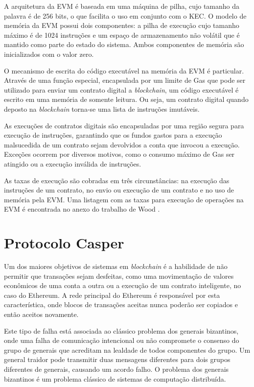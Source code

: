 \documentclass[tcc,capa]{texufpel}
\begin{document}
	A arquitetura da EVM é baseada em uma máquina de pilha, cujo tamanho da palavra é de 256 bits, o que facilita o uso em conjunto com o KEC. O modelo de memória da EVM possui dois componentes: a pilha de execução cujo tamanho máximo é de 1024 instruções e um espaço de armazenamento não volátil que é mantido como parte do estado do sistema. Ambos componentes de memória são inicializados com o valor zero.
	
	O mecanismo de escrita do código executável na memória da EVM é particular. Através de uma função especial, encapsulada por um limite de Gas que pode ser utilizado para enviar um contrato digital a \textit{blockchain}, um código executável é escrito em uma memória de somente leitura. Ou seja, um contrato digital quando deposto na \textit{blockchain} torna-se uma lista de instruções imutáveis.
	
	As execuções de contratos digitais são encapsuladas por uma região segura para execução de instruções, garantindo que os fundos gastos para a execução malsucedida de um contrato sejam devolvidos a conta que invocou a execução. Exceções ocorrem por diversos motivos, como o consumo máximo de Gas ser atingido ou a execução inválida de instruções.
	
	As taxas de execução são cobradas em três circunstâncias: na execução das instruções de um contrato, no envio ou execução de um contrato e no uso de memória pela EVM. Uma listagem com as taxas para execução de operações na EVM é encontrada no anexo do trabalho de Wood \cite{wood2014ethereum}.
  
    
    \section{Protocolo Casper}
    
    Um dos maiores objetivos de sistemas em \textit{blockchain} é a habilidade de não permitir que transações sejam desfeitas, como uma movimentação de valores econômicos de uma conta a outra ou a execução de um contrato inteligente, no caso do Ethereum. A rede principal do Ethereum é responsável por esta característica, onde blocos de transações aceitas nunca poderão ser copiados e então aceitos novamente.
    
    Este tipo de falha está associada ao clássico problema dos generais bizantinos, onde uma falha de comunicação intencional ou não compromete o consenso do grupo de generais que acreditam na lealdade de todos componentes do grupo. Um general traidor pode transmitir duas mensagens diferentes para dois grupos diferentes de generais, causando um acordo falho. O problema dos generais bizantinos é um problema clássico de sistemas de computação distribuída.
    
\end{document}
